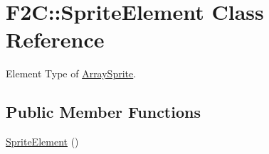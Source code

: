 \hypertarget{class_f2_c_1_1_sprite_element}{
\section{F2C::SpriteElement Class Reference}
\label{class_f2_c_1_1_sprite_element}
}


Element Type of \hyperlink{class_f2_c_1_1_array_sprite}{ArraySprite}.  
\subsection*{Public Member Functions}
\begin{DoxyCompactItemize}
\item 
\hypertarget{class_f2_c_1_1_sprite_element_a197d9960d5ea7808abf99e3ecdcbbd51}{
\hyperlink{class_f2_c_1_1_sprite_element_a197d9960d5ea7808abf99e3ecdcbbd51}{SpriteElement} ()}
\label{class_f2_c_1_1_sprite_element_a197d9960d5ea7808abf99e3ecdcbbd51}


\end{DoxyCompactItemize}
